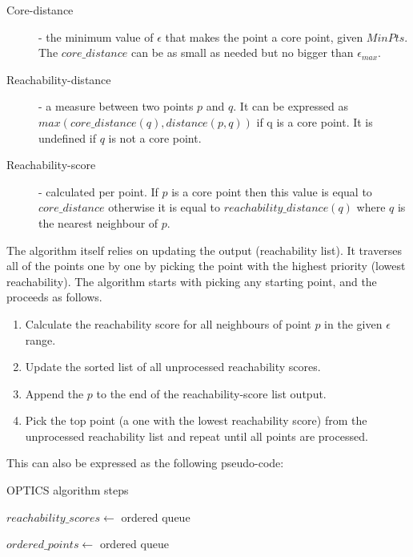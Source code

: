 \begin{description}
   \item[Core-distance] - the minimum value of $\epsilon$ that makes the point a core point, given $MinPts$. The $core\_distance$ can be as small as needed but no bigger than $\epsilon_{max}$.
   \item[Reachability-distance] - a measure between two points $p$ and $q$. It can be expressed as \\ $max(core\_distance(q), distance(p,q))$ if q is a core point. It is undefined if $q$ is not a core point.
  \item[Reachability-score] - calculated per point. If $p$ is a core point then this value is equal to $core\_distance$ otherwise it is equal to $reachability\_distance(q)$ where $q$ is the nearest neighbour of $p$.
\end{description}

The algorithm itself relies on updating the output (reachability list). It traverses all of the points one by one by picking the point with the highest priority (lowest reachability). The algorithm starts with picking any starting point, and the proceeds as follows.

\begin{enumerate}
\item Calculate the reachability score for all neighbours of point $p$ in the given $\epsilon$ range.
\item Update the sorted list of all unprocessed reachability scores.
\item Append the $p$ to the end of the reachability-score list output.
\item Pick the top point (a one with the lowest reachability score) from the unprocessed reachability list and repeat until all points are processed.
\end{enumerate}

This can also be expressed as the following pseudo-code:

\begin{algorithm}[ht]
\caption{OPTICS algorithm steps}\label{alg:optics}
$reachability\_scores \gets$ ordered queue

$ordered\_points \gets $ ordered queue

\end{algorithm}

